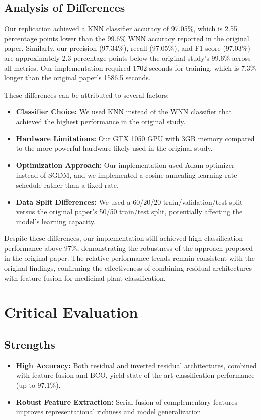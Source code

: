 \documentclass[journal,onecolumn]{IEEEtran}
\begin{document}
\subsection{Analysis of Differences}
Our replication achieved a KNN classifier accuracy of 97.05\%, which is 2.55 percentage points lower than the 99.6\% WNN accuracy reported in the original paper. Similarly, our precision (97.34\%), recall (97.05\%), and F1-score (97.03\%) are approximately 2.3 percentage points below the original study's 99.6\% across all metrics. Our implementation required 1702 seconds for training, which is 7.3\% longer than the original paper's 1586.5 seconds.

These differences can be attributed to several factors:
\begin{itemize}
  \item \textbf{Classifier Choice:} We used KNN instead of the WNN classifier that achieved the highest performance in the original study.
  \item \textbf{Hardware Limitations:} Our GTX 1050 GPU with 3GB memory compared to the more powerful hardware likely used in the original study.
  \item \textbf{Optimization Approach:} Our implementation used Adam optimizer instead of SGDM, and we implemented a cosine annealing learning rate schedule rather than a fixed rate.
  \item \textbf{Data Split Differences:} We used a 60/20/20 train/validation/test split versus the original paper's 50/50 train/test split, potentially affecting the model's learning capacity.
\end{itemize}

Despite these differences, our implementation still achieved high classification performance above 97\%, demonstrating the robustness of the approach proposed in the original paper. The relative performance trends remain consistent with the original findings, confirming the effectiveness of combining residual architectures with feature fusion for medicinal plant classification.


\section{Critical Evaluation}
\subsection{Strengths}
\begin{itemize}
  \item \textbf{High Accuracy:} Both residual and inverted residual architectures, combined with feature fusion and BCO, yield state‑of‑the‑art classification performance (up to 97.1\%).
  \item \textbf{Robust Feature Extraction:} Serial fusion of complementary features improves representational richness and model generalization.
\end{itemize}
\end{document}
